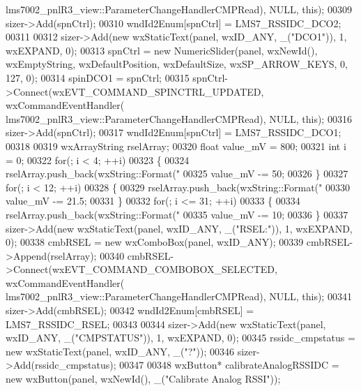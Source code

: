 \begin{DoxyCode}
{      lms7002_pnlR3_view::ParameterChangeHandlerCMPRead), NULL, \textcolor{keyword}{this});
00309         sizer->Add(spnCtrl);
00310         wndId2Enum[spnCtrl] = LMS7_RSSIDC_DCO2;
00311 
00312         sizer->Add(\textcolor{keyword}{new} wxStaticText(panel, wxID\_ANY, \_(\textcolor{stringliteral}{"DCO1"})), 1, wxEXPAND, 0);
00313         spnCtrl = \textcolor{keyword}{new} NumericSlider(panel, wxNewId(), wxEmptyString, wxDefaultPosition, wxDefaultSize, 
      wxSP\_ARROW\_KEYS, 0, 127, 0);
00314         spinDCO1 = spnCtrl;
00315         spnCtrl->Connect(wxEVT\_COMMAND\_SPINCTRL\_UPDATED, wxCommandEventHandler(
      lms7002_pnlR3_view::ParameterChangeHandlerCMPRead), NULL, \textcolor{keyword}{this});
00316         sizer->Add(spnCtrl);
00317         wndId2Enum[spnCtrl] = LMS7_RSSIDC_DCO1;
00318 
00319         wxArrayString rselArray;
00320         \textcolor{keywordtype}{float} value\_mV = 800;
00321         \textcolor{keywordtype}{int} i = 0;
00322         \textcolor{keywordflow}{for}(; i < 4; ++i)
00323         \{
00324             rselArray.push\_back(wxString::Format(\textcolor{stringliteral}{"%
00325             value\_mV -= 50;
00326         \}
00327         \textcolor{keywordflow}{for}(; i < 12; ++i)
00328         \{
00329             rselArray.push\_back(wxString::Format(\textcolor{stringliteral}{"%
00330             value\_mV -= 21.5;
00331         \}
00332         \textcolor{keywordflow}{for}(; i <= 31; ++i)
00333         \{
00334             rselArray.push\_back(wxString::Format(\textcolor{stringliteral}{"%
00335             value\_mV -= 10;
00336         \}
00337         sizer->Add(\textcolor{keyword}{new} wxStaticText(panel, wxID\_ANY, \_(\textcolor{stringliteral}{"RSEL:"})), 1, wxEXPAND, 0);
00338         cmbRSEL = \textcolor{keyword}{new} wxComboBox(panel, wxID\_ANY);
00339         cmbRSEL->Append(rselArray);
00340         cmbRSEL->Connect(wxEVT\_COMMAND\_COMBOBOX\_SELECTED, wxCommandEventHandler(
      lms7002_pnlR3_view::ParameterChangeHandlerCMPRead), NULL, \textcolor{keyword}{this});
00341         sizer->Add(cmbRSEL);
00342         wndId2Enum[cmbRSEL] = LMS7_RSSIDC_RSEL;
00343 
00344         sizer->Add(\textcolor{keyword}{new} wxStaticText(panel, wxID\_ANY, \_(\textcolor{stringliteral}{"CMPSTATUS"})), 1, wxEXPAND, 0);
00345         rssidc_cmpstatus = \textcolor{keyword}{new} wxStaticText(panel, wxID\_ANY, \_(\textcolor{stringliteral}{"?"}));
00346         sizer->Add(rssidc_cmpstatus);
00347 
00348         wxButton* calibrateAnalogRSSIDC = \textcolor{keyword}{new} wxButton(panel, wxNewId(), \_(\textcolor{stringliteral}{"Calibrate Analog RSSI"}));
}}}}
\end{DoxyCode}

